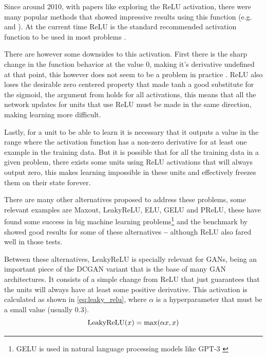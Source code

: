 Since around 2010, with papers like \cite{relu2011} exploring the \gls{ReLU} activation, there were many popular methods that showed impressive results using this function (e.g. \cite{alexnet2012} and \cite{inceptionV3_2015}). At the current time \gls{ReLU} is the standard recommended activation function to be used in most problems \cite{deepLearningBook2016}.

There are however some downsides to this activation. First there is the sharp change in the function behavior at the value $0$, making it's derivative undefined at that point, this however does not seem to be a problem in practice \cite{relu2011}. \gls{ReLU} also loses the desirable zero centered property that made \gls{tanh} a good substitute for the sigmoid, the argument from \textcite{efficientBackprop2012} holds for all activations, this means that all the network updates for units that use \gls{ReLU} must be made in the same direction, making learning more difficult.

Lastly, for a unit to be able to learn it is necessary that it outputs a value in the range where the activation function has a non-zero derivative for at least one example in the training data. But it is possible that for all the training data in a given problem, there exists some units using \gls{ReLU} activations that will always output zero, this makes learning impossible in these units and effectively freezes them on their state forever.

There are many other alternatives proposed to address these problems, some relevant examples are Maxout, LeakyReLU, ELU, GELU and PReLU, these have found some success in big machine learning problems\footnote{
    GELU is used in natural language processing models like GPT-3 \cite{gpt3_2020}
} and the benchmark by \cite{CaffeNetBench2017} showed good results for some of these alternatives \textbf{--} although \gls{ReLU} also fared well in those tests.

Between these alternatives, LeakyReLU is specially relevant for \acp{GAN}, being an important piece of the \gls{DCGAN} variant that is the base of many \gls{GAN} architectures. It consists of a simple change from ReLU that just guarantees that the units will always have at least some positive derivative. This activation is calculated as shown in \autoref{eq:leaky_relu}, where $\alpha$ is a hyperparameter that must be a small value (usually $0.3$).
\begin{equation} \label{eq:leaky_relu}
    \operatorname{LeakyReLU}(x) = \max(\alpha x, x)
\end{equation}

